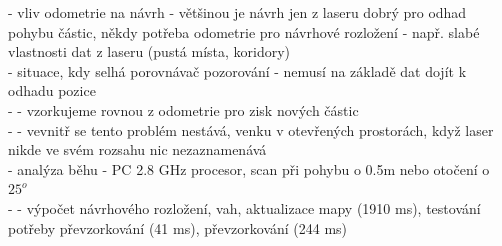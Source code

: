 \documentclass[11pt]{article}
\begin{document}
 - vliv odometrie na návrh - většinou je návrh jen z laseru dobrý pro odhad pohybu částic, někdy potřeba odometrie pro návrhové rozložení - např. slabé vlastnosti dat z laseru (pustá místa, koridory)\\
 - situace, kdy selhá porovnávač pozorování - nemusí na základě dat dojít k odhadu pozice\\
 - - vzorkujeme rovnou z odometrie pro zisk nových částic\\
 - - vevnitř se tento problém nestává, venku v otevřených prostorách, když laser nikde ve svém rozsahu nic nezaznamenává\\
 - analýza běhu - PC 2.8 GHz procesor, scan při pohybu o 0.5m nebo otočení o $25^o$\\
 - - výpočet návrhového rozložení, vah, aktualizace mapy (1910 ms), testování potřeby převzorkování (41 ms), převzorkování (244 ms)\\
\end{document}
